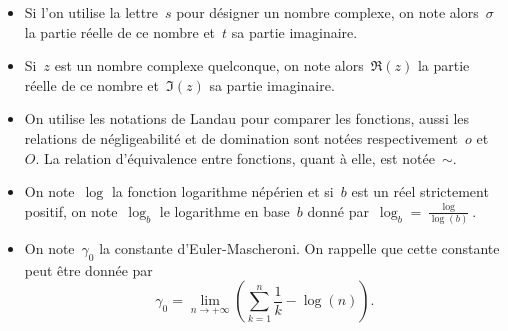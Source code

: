 \begin{itemize}
			\item Si l'on utilise la lettre~$s$ pour désigner un nombre complexe, on note alors~$\sigma$ la partie réelle de ce nombre et~$t$ sa partie imaginaire.
			\item Si~$z$ est un nombre complexe quelconque, on note alors~$\Re(z)$ la partie réelle de ce nombre et~$\Im(z)$ sa partie imaginaire.
			\item On utilise les notations de Landau pour comparer les fonctions, aussi les relations de négligeabilité et de domination sont notées respectivement~$o$ et~$O$. La relation d'équivalence entre fonctions, quant à elle, est notée~$\sim$.
			\item On note~$\log$ la fonction logarithme népérien et si~$b$ est un réel strictement positif, on note~$\log_b$ le logarithme en base~$b$ donné par~$\log_b = \frac{\log}{\log(b)}$.
			\item On note~$\gamma_0$ la constante d'Euler-Mascheroni. On rappelle que cette constante peut être donnée par
			\[
				\gamma_0 = \lim_{n\rightarrow+\infty} \left(\sum_{k=1}^{n}\frac{1}{k}-\log(n)\right).
			\]
		\end{itemize}
		